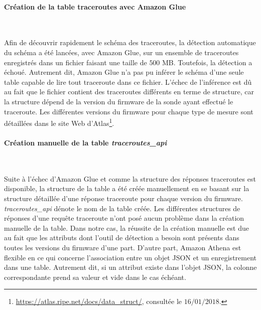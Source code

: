 \paragraph{Création de la table traceroutes avec Amazon Glue}~

Afin de découvrir rapidement le schéma des traceroutes,     la détection automatique du schéma a été lancées, avec Amazon Glue, sur un ensemble de  traceroutes enregistrés dans un fichier faisant une taille de $500$ MB. Toutefois, la détection a échoué. Autrement dit, Amazon Glue n'a pas pu inférer le schéma d'une seule table capable de lire tout traceroute dans ce fichier.  L'échec de l'inférence est dû au fait que le fichier contient des traceroutes différents en terme de structure, car la structure dépend de la version du firmware de la sonde ayant effectué le traceroute. Les différentes versions du firmware  pour chaque type de mesure sont détaillées dans le site Web d'Atlas\footnote{\url{https://atlas.ripe.net/docs/data_struct/}, consultée le $16/01/2018$.}.

\paragraph{Création manuelle de la table \textit{traceroutes\_api}}~ \label{creer-table-traceroute}

Suite à l'échec d'Amazon Glue  et comme la structure des réponses traceroutes est disponible,  la structure de la table a été créée   manuellement en se basant sur la structure détaillée d'une réponse traceroute pour chaque version du firmware. \textit{traceroutes\_api} dénote le nom de la table créée. Les différentes structures de réponses d'une requête traceroute n'ont posé aucun problème dans la création manuelle de la table. Dans notre cas, la réussite de la création manuelle est due au fait que les attributs dont l'outil de détection a besoin sont présents dans toutes les versions du firmware d'une part. D'autre part, Amazon Athena est flexible en ce qui concerne l'association entre un objet JSON et un enregistrement dans une table. Autrement dit, si un attribut existe dans l'objet JSON, la colonne correspondante prend sa valeur et vide dans le cas échéant.  

